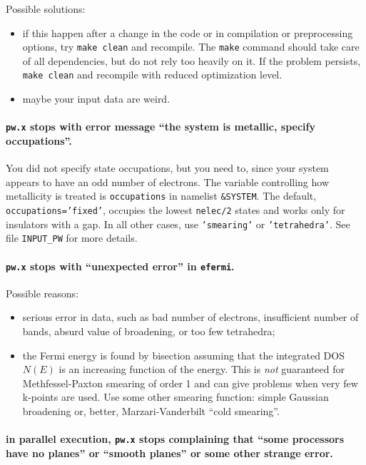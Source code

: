 \documentclass[12pt,a4paper]{article}
\begin{document}
Possible solutions:
\begin{itemize}
  \item
    if this happen after a change in the code or in compilation or
    preprocessing options, try \texttt{make clean} and recompile.
    The \texttt{make} command should take care of all dependencies,
    but do not rely too heavily on it. 
    If the problem persists, \texttt{make clean} and recompile with
    reduced optimization level.
  \item
    maybe your input data are weird.
\end{itemize}

\paragraph{\texttt{pw.x} stops with error message ``the system is
           metallic, specify occupations''.}

You did not specify state occupations, but you need to, since your
system appears to have an odd number of electrons.
The variable controlling how metallicity is treated is
\texttt{occupations} in namelist \texttt{\&SYSTEM}.
The default, \texttt{occupations='fixed'}, occupies the lowest
\texttt{nelec/2} states and works only for insulators with a gap.
In all other cases, use \texttt{'smearing'} or \texttt{'tetrahedra'}.
See file \texttt{INPUT\_PW} for more details.

\paragraph{\texttt{pw.x} stops with ``unexpected error'' in
           \texttt{efermi}.}

Possible reasons:
\begin{itemize}
  \item
    serious error in data, such as bad number of electrons,
    insufficient number of bands, absurd value of broadening, or too
    few tetrahedra;
  \item
    the Fermi energy is found by bisection assuming that the
    integrated DOS $N(E)$ is an increasing function of the energy. 
    This is {\em not} guaranteed for Methfessel-Paxton smearing of
    order 1 and can give problems when very few k-points are used.
    Use some other smearing function: simple Gaussian broadening or,
    better, Marzari-Vanderbilt ``cold smearing''.
\end{itemize}

\paragraph{in parallel execution, \texttt{pw.x} stops complaining that
           ``some processors have no planes'' or ``smooth planes'' or
           some other strange error.}
\end{document}
